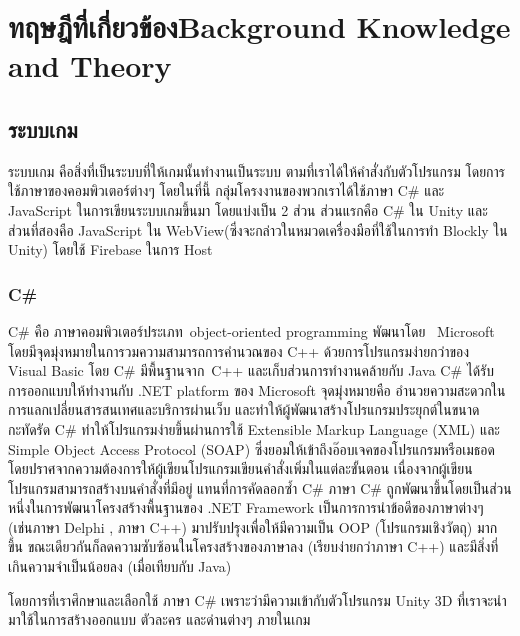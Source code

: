 \chapter{\ifcpe ทฤษฎีที่เกี่ยวข้อง\else Background Knowledge and Theory\fi}

\section{ระบบเกม}
ระบบเกม คือสิ่งที่เป็นระบบที่ให้เกมนั้นทำงานเป็นระบบ 
ตามที่เราได้ให้คำสั่งกับตัวโปรแกรม 
โดยการใช้ภาษาของคอมพิวเตอร์ต่างๆ 
โดยในที่นี้ กลุ่มโครงงานของพวกเราได้ใช้ภาษา C\#\cite{cs} และ JavaScript\cite{js}
ในการเขียนระบบเกมขึ้นมา โดยแบ่งเป็น 2 ส่วน ส่วนแรกคือ C\# ใน Unity 
และ ส่วนที่สองคือ JavaScript ใน WebView(ซึ่งจะกล่าวในหมวดเครื่องมือที่ใช้ในการทำ Blockly ใน Unity) โดยใช้ Firebase ในการ Host\par

\subsection{C\#}
C\# คือ ภาษาคอมพิวเตอร์ประเภท  object-oriented programming พัฒนาโดย
  Microsoft โดยมีจุดมุ่งหมายในการวมความสามารถการคำนวณของ 
C++ ด้วยการโปรแกรมง่ายกว่าของ Visual Basic โดย C\# มีพื้นฐานจาก 
C++ และเก็บส่วนการทำงานคล้ายกับ Java 
C\# ได้รับการออกแบบให้ทำงานกับ .NET platform ของ Microsoft
จุดมุ่งหมายคือ อำนวยความสะดวกในการแลกเปลี่ยนสารสนเทศและบริการผ่านเว็บ 
และทำให้ผู้พัฒนาสร้างโปรแกรมประยุกต์ในขนาดกะทัดรัด C\# 
ทำให้โปรแกรมง่ายขึ้นผ่านการใช้ Extensible Markup Language (XML) 
และ Simple Object Access Protocol (SOAP) 
ซึ่งยอมให้เข้าถึงอ๊อบเจคของโปรแกรมหรือเมธอด 
โดยปราศจากความต้องการให้ผู้เขียนโปรแกรมเขียนคำสั่งเพิ่มในแต่ละขั้นตอน 
เนื่องจากผู้เขียนโปรแกรมสามารถสร้างบนคำสั่งที่มีอยู่ 
แทนที่การคัดลอกซ้ำ C\#
ภาษา C\# ถูกพัฒนาขึ้นโดยเป็นส่วนหนึ่งในการพัฒนาโครงสร้างพื้นฐานของ
.NET Framework เป็นการการนำข้อดีของภาษาต่างๆ 
(เช่นภาษา Delphi , ภาษา C++) มาปรับปรุงเพื่อให้มีความเป็น OOP 
(โปรแกรมเชิงวัตถุ) มากขึ้น ขณะเดียวกันก็ลดความซับซ้อนในโครงสร้างของภาษาลง (เรียบง่ายกว่าภาษา C++) 
และมีสิ่งที่เกินความจำเป็นน้อยลง (เมื่อเทียบกับ Java)~\cite{cs}\par
โดยการที่เราศึกษาและเลือกใช้ ภาษา C\# เพราะว่ามีความเข้ากับตัวโปรแกรม 
Unity 3D ที่เราจะนำมาใช้ในการสร้างออกแบบ ตัวละคร และด่านต่างๆ ภายในเกม\newline
